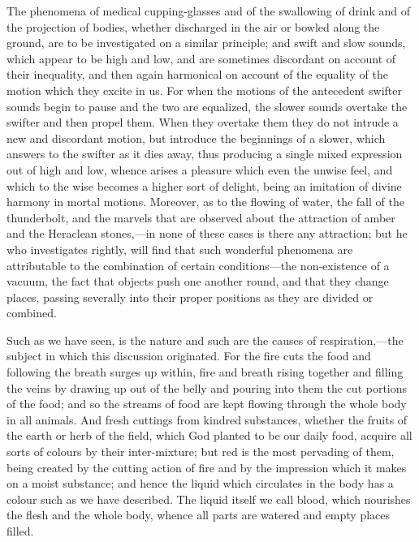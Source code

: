 \documentclass[11pt,letter]{article}
\begin{document}
\par  The phenomena of medical cupping-glasses and of the swallowing of drink and of the projection of bodies, whether discharged in the air or bowled along the ground, are to be investigated on a similar principle; and swift and slow sounds, which appear to be high and low, and are sometimes discordant on account of their inequality, and then again harmonical on account of the equality of the motion which they excite in us. For when the motions of the antecedent swifter sounds begin to pause and the two are equalized, the slower sounds overtake the swifter and then propel them. When they overtake them they do not intrude a new and discordant motion, but introduce the beginnings of a slower, which answers to the swifter as it dies away, thus producing a single mixed expression out of high and low, whence arises a pleasure which even the unwise feel, and which to the wise becomes a higher sort of delight, being an imitation of divine harmony in mortal motions. Moreover, as to the flowing of water, the fall of the thunderbolt, and the marvels that are observed about the attraction of amber and the Heraclean stones,—in none of these cases is there any attraction; but he who investigates rightly, will find that such wonderful phenomena are attributable to the combination of certain conditions—the non-existence of a vacuum, the fact that objects push one another round, and that they change places, passing severally into their proper positions as they are divided or combined.

\par  Such as we have seen, is the nature and such are the causes of respiration,—the subject in which this discussion originated. For the fire cuts the food and following the breath surges up within, fire and breath rising together and filling the veins by drawing up out of the belly and pouring into them the cut portions of the food; and so the streams of food are kept flowing through the whole body in all animals. And fresh cuttings from kindred substances, whether the fruits of the earth or herb of the field, which God planted to be our daily food, acquire all sorts of colours by their inter-mixture; but red is the most pervading of them, being created by the cutting action of fire and by the impression which it makes on a moist substance; and hence the liquid which circulates in the body has a colour such as we have described. The liquid itself we call blood, which nourishes the flesh and the whole body, whence all parts are watered and empty places filled.
\end{document}
